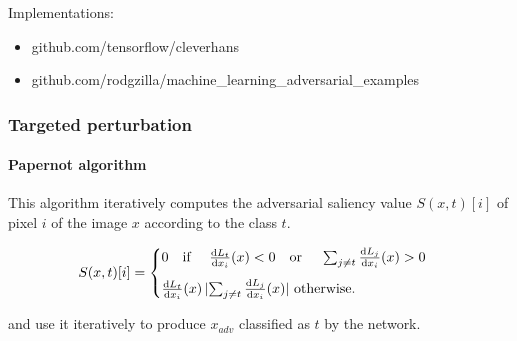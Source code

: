 \documentclass[9pt]{beamer}
\begin{document}
\begin{frame}
  \bigskip

  Implementations:
  \begin{itemize}
    \item github.com/tensorflow/cleverhans
    \item github.com/rodgzilla/machine\_learning\_adversarial\_examples
  \end{itemize}

\end{frame}

\appendix

\begin{frame}
  \frametitle{Targeted perturbation}

  \framesubtitle{Papernot algorithm}

  This algorithm iteratively computes the adversarial saliency value
  $S(x, t)[i]$ of pixel $i$ of the image $x$ according to the class
  $t$.

  \medskip

  \[
  S(x, t)[i] =
  \begin{cases}
    0 \text{\quad if \quad} \frac{\mathrm{d} L_{t}}{\mathrm{d} x_{i}}(x) < 0
    \text{\quad or \quad} \sum_{j \neq t} \frac{\mathrm{d} L_{j}}{\mathrm{d} x_{i}}(x)
    > 0 \\[0.3cm]
    \frac{\mathrm{d} L_{t}}{\mathrm{d} x_{i}}(x) \, \lvert \sum_{j \neq
      t} \frac{\mathrm{d} L_{j}}{\mathrm{d} x_{i}}(x) \rvert \text{ otherwise.}
  \end{cases}
  \]

  \medskip

  and use it iteratively to produce $x_{adv}$ classified as $t$ by the
  network.

\end{frame}
\end{document}
